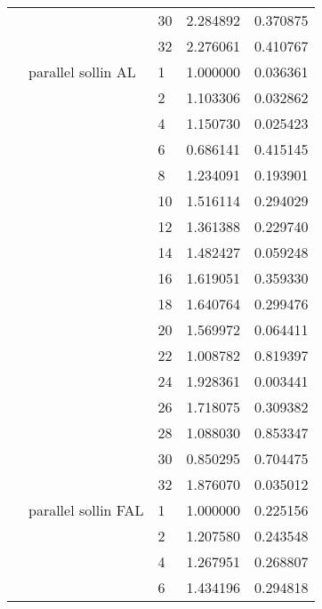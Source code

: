 \begin{tabular}{lllrr}
                      &                     & 30 &  2.284892 &  0.370875 \\
                      &                     & 32 &  2.276061 &  0.410767 \\
                      & parallel sollin AL & 1  &  1.000000 &  0.036361 \\
                      &                     & 2  &  1.103306 &  0.032862 \\
                      &                     & 4  &  1.150730 &  0.025423 \\
                      &                     & 6  &  0.686141 &  0.415145 \\
                      &                     & 8  &  1.234091 &  0.193901 \\
                      &                     & 10 &  1.516114 &  0.294029 \\
                      &                     & 12 &  1.361388 &  0.229740 \\
                      &                     & 14 &  1.482427 &  0.059248 \\
                      &                     & 16 &  1.619051 &  0.359330 \\
                      &                     & 18 &  1.640764 &  0.299476 \\
                      &                     & 20 &  1.569972 &  0.064411 \\
                      &                     & 22 &  1.008782 &  0.819397 \\
                      &                     & 24 &  1.928361 &  0.003441 \\
                      &                     & 26 &  1.718075 &  0.309382 \\
                      &                     & 28 &  1.088030 &  0.853347 \\
                      &                     & 30 &  0.850295 &  0.704475 \\
                      &                     & 32 &  1.876070 &  0.035012 \\
                      & parallel sollin FAL & 1  &  1.000000 &  0.225156 \\
                      &                     & 2  &  1.207580 &  0.243548 \\
                      &                     & 4  &  1.267951 &  0.268807 \\
                      &                     & 6  &  1.434196 &  0.294818 \\

\end{tabular}
